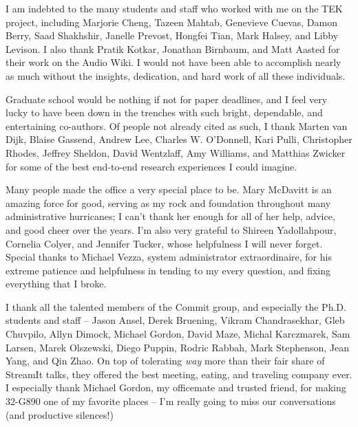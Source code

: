I am indebted to the many students and staff who worked with me on
the TEK project, including Marjorie Cheng, Tazeen Mahtab, Genevieve
Cuevas, Damon Berry, Saad Shakhshir, Janelle Prevost, Hongfei Tian,
Mark Halsey, and Libby Levison.  I also thank Pratik Kotkar,
Jonathan Birnbaum, and Matt Aasted for their work on the Audio Wiki.
I would not have been able to accomplish nearly as much without the
insights, dedication, and hard work of all these individuals.

%

Graduate school would be nothing if not for paper deadlines, and I
feel very lucky to have been down in the trenches with such bright,
dependable, and entertaining co-authors.  Of people not already cited
as such, I thank Marten van Dijk, Blaise Gassend, Andrew Lee, Charles
W. O'Donnell, Kari Pulli, Christopher Rhodes, Jeffrey Sheldon, David
Wentzlaff, Amy Williams, and Matthias Zwicker for some of the best
end-to-end research experiences I could imagine.

Many people made the office a very special place to be.  Mary McDavitt
is an amazing force for good, serving as my rock and foundation
throughout many administrative hurricanes; I can't thank her enough
for all of her help, advice, and good cheer over the years.  I'm also
very grateful to Shireen Yadollahpour, Cornelia Colyer, and Jennifer
Tucker, whose helpfulness I will never forget.  Special thanks to
Michael Vezza, system administrator extraordinaire, for his extreme
patience and helpfulness in tending to my every question, and fixing
everything that I broke.

I thank all the talented members of the Commit group, and especially
the Ph.D. students and staff -- Jason Ansel, Derek Bruening, Vikram
Chandrasekhar, Gleb Chuvpilo, Allyn Dimock, Michael Gordon, David
Maze, Michal Karczmarek, Sam Larsen, Marek Olszewski, Diego Puppin,
Rodric Rabbah, Mark Stephenson, Jean Yang, and Qin Zhao.  On top of
tolerating {\it way} more than their fair share of StreamIt talks,
they offered the best meeting, eating, and traveling company ever.  I
especially thank Michael Gordon, my officemate and trusted friend, for
making 32-G890 one of my favorite places -- I'm really going to miss
our conversations (and productive silences!)

